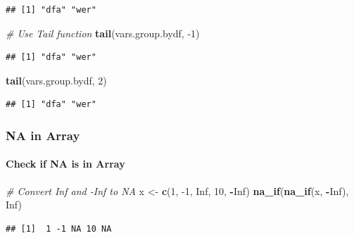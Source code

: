 \documentclass[
]{book}
\newenvironment{Shaded}{\begin{snugshade}}{\end{snugshade}}
\newcommand{\CommentTok}[1]{\textcolor[rgb]{0.56,0.35,0.01}{\textit{#1}}}
\newcommand{\DecValTok}[1]{\textcolor[rgb]{0.00,0.00,0.81}{#1}}
\newcommand{\KeywordTok}[1]{\textcolor[rgb]{0.13,0.29,0.53}{\textbf{#1}}}
\newcommand{\NormalTok}[1]{#1}
\newcommand{\OperatorTok}[1]{\textcolor[rgb]{0.81,0.36,0.00}{\textbf{#1}}}
\newcommand{\OtherTok}[1]{\textcolor[rgb]{0.56,0.35,0.01}{#1}}
\newcommand{\StringTok}[1]{\textcolor[rgb]{0.31,0.60,0.02}{#1}}
\begin{document}
\begin{verbatim}
## [1] "dfa" "wer"
\end{verbatim}

\begin{Shaded}
\begin{Highlighting}[]
\CommentTok{\# Use Tail function}
\KeywordTok{tail}\NormalTok{(vars.group.bydf, }\DecValTok{{-}1}\NormalTok{)}
\end{Highlighting}
\end{Shaded}

\begin{verbatim}
## [1] "dfa" "wer"
\end{verbatim}

\begin{Shaded}
\begin{Highlighting}[]
\KeywordTok{tail}\NormalTok{(vars.group.bydf, }\DecValTok{2}\NormalTok{)}
\end{Highlighting}
\end{Shaded}

\begin{verbatim}
## [1] "dfa" "wer"
\end{verbatim}

\hypertarget{na-in-array}{%
\subsubsection{NA in Array}\label{na-in-array}}

\hypertarget{check-if-na-is-in-array}{%
\paragraph{Check if NA is in Array}\label{check-if-na-is-in-array}}

\begin{Shaded}
\begin{Highlighting}[]
\CommentTok{\# Convert Inf and {-}Inf to NA}
\NormalTok{x \textless{}{-}}\StringTok{ }\KeywordTok{c}\NormalTok{(}\DecValTok{1}\NormalTok{, }\DecValTok{{-}1}\NormalTok{, }\OtherTok{Inf}\NormalTok{, }\DecValTok{10}\NormalTok{, }\OperatorTok{{-}}\OtherTok{Inf}\NormalTok{)}
\KeywordTok{na\_if}\NormalTok{(}\KeywordTok{na\_if}\NormalTok{(x, }\OperatorTok{{-}}\OtherTok{Inf}\NormalTok{), }\OtherTok{Inf}\NormalTok{)}
\end{Highlighting}
\end{Shaded}

\begin{verbatim}
## [1]  1 -1 NA 10 NA
\end{verbatim}
\end{document}
